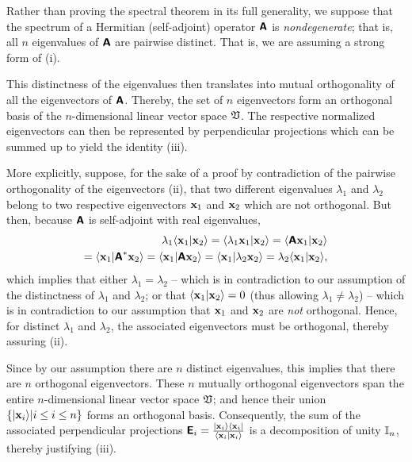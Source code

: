 {\color{OliveGreen}
\bproof
Rather than proving the spectral theorem in its full generality,
we suppose that the spectrum of a Hermitian (self-adjoint) operator $ \textsf{\textbf{A}}$ is {\em nondegenerate};
that is, all $n$ eigenvalues of $\textsf{\textbf{A}}$ are pairwise distinct.
That is, we are assuming a strong form of (i).

This distinctness of the eigenvalues then translates into mutual orthogonality of all the eigenvectors of $ \textsf{\textbf{A}}$.
Thereby, the set of $n$ eigenvectors form an orthogonal basis of the $n$-dimensional linear vector space $\frak V$.
The respective normalized eigenvectors can then be represented by perpendicular projections which can be summed up to yield the identity
(iii).

More explicitly, suppose, for the sake of a proof by contradiction of the pairwise orthogonality of the eigenvectors (ii),
that two different eigenvalues
$\lambda_1$
and
$\lambda_2$
belong to two respective eigenvectors
${\bf x}_1$
and
${\bf x}_2$
which are not orthogonal.
But then, because $\textsf{\textbf{A}}$ is self-adjoint with real eigenvalues,
\begin{equation}
\begin{split}
\lambda_1  \langle {\bf x}_1 \vert {\bf x}_2 \rangle =
\langle \lambda_1  {\bf x}_1 \vert {\bf x}_2 \rangle =
  \langle \textsf{\textbf{A}}{\bf x}_1 \vert {\bf x}_2 \rangle \\=
  \langle {\bf x}_1 \vert \textsf{\textbf{A}}^* {\bf x}_2 \rangle =
  \langle {\bf x}_1 \vert \textsf{\textbf{A}}{\bf x}_2 \rangle =
  \langle {\bf x}_1 \vert \lambda_2 {\bf x}_2 \rangle=
  \lambda_2 \langle {\bf x}_1 \vert {\bf x}_2 \rangle,
\end{split}
\end{equation}
which implies that either   $\lambda_1  = \lambda_2$ -- which is in contradiction to our assumption of the distinctness of  $\lambda_1$ and $\lambda_2$;
or that  $\langle {\bf x}_1 \vert {\bf x}_2 \rangle =0$  (thus allowing $\lambda_1  \neq \lambda_2$) --
which is in contradiction to our assumption that ${\bf x}_1$ and $ {\bf x}_2$ are {\em not} orthogonal.
Hence, for distinct   $\lambda_1$ and $\lambda_2$, the associated eigenvectors must be orthogonal,
thereby assuring (ii).

Since by our assumption there are $n$ distinct eigenvalues, this implies that there are $n$ orthogonal eigenvectors.
These $n$ mutually orthogonal eigenvectors
span the entire $n$-dimensional linear vector space $\frak V$;
and hence their union $\{ \vert {\bf x}_i \rangle \vert i\le i \le n\}$ forms an orthogonal basis.
Consequently, the sum of the associated perpendicular projections $\textsf{\textbf{E}}_i = \frac{\vert {\bf x}_i \rangle \langle {\bf x}_i \vert}{\langle {\bf x}_i \vert {\bf x}_i  \rangle}$
is a decomposition of unity ${\Bbb I}_n$, thereby justifying (iii).

}
